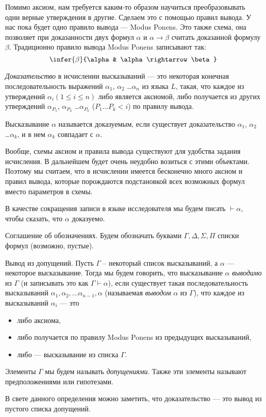 Помимо аксиом, нам требуется каким-то образом научиться преобразовывать одни верные утверждения
в другие.
Сделаем это с помощью правил вывода. У нас пока будет одно правило вывода --- Modus Ponens.
Это также схема, она позволяет при доказанности двух формул $\alpha$ и $\alpha \rightarrow \beta$
считать доказанной формулу $\beta$. Традиционно правило вывода Modus Ponens записывают так:
$$\infer{\beta}{\alpha & \alpha \rightarrow \beta}$$

\begin{definition} \emph{Доказательство} в исчислении высказываний --- 
это некоторая конечная последовательность выражений 
$\alpha_1$, $\alpha_2$ \dots $\alpha_n$
из языка $L$, такая, что каждое из утверждений $\alpha_i (1 \le i \le n)$
либо является аксиомой, либо получается из других
утверждений $\alpha_{P_1}$, $\alpha_{P_2}$ \dots $\alpha_{P_k}$ 
($P_1 \dots P_k < i$) по правилу вывода.
\end{definition}

\begin{definition} Высказывание $\alpha$ называется доказуемым, если 
существует доказательство $\alpha_1$, $\alpha_2$ \dots $\alpha_k$, и в нем
$\alpha_k$ совпадает с $\alpha$. 
\end{definition}

Вообще, схемы аксиом и правила вывода существуют для удобства задания
исчисления. В дальнейшем будет очень неудобно возиться с этими объектами.
Поэтому мы считаем, что в исчислении имеется бесконечно много аксиом и правил вывода,
которые порождаются подстановкой всех возможных формул вместо параметров в схемы.

В качестве сокращения записи в языке исследователя мы будем писать $\vdash \alpha$,
чтобы сказать, что $\alpha$ доказуемо.

Соглашение об обозначениях. Будем обозначать буквами 
$\Gamma, \Delta, \Sigma, \Pi$ списки формул (возможно, пустые).

\begin{definition}{Вывод из допущений.}
Пусть $\Gamma$ -- некоторый список высказываний, а $\alpha$ --- 
некоторое высказывание. 
Тогда мы будем говорить, что высказывание $\alpha$ \emph{выводимо} из $\Gamma$ 
(и записывать это как $\Gamma \vdash \alpha$), если существует такая 
последовательность высказываний $\alpha_1, \alpha_2, \dots \alpha_{n-1}, \alpha$
(называемая \emph{выводом} $\alpha$ из $\Gamma$), 
что каждое из высказываний $\alpha_i$ --- это 
\begin{itemize}
\item либо аксиома,
\vspace{-0.2cm}
\item либо получается по правилу Modus Ponens из предыдущих высказываний, 
\vspace{-0.2cm}
\item либо --- высказывание из списка $\Gamma$.
\end{itemize}
Элементы $\Gamma$ мы будем называть \emph{допущениями}. Также эти элементы
называют предположениями или гипотезами. 
\end{definition}

В свете данного определения можно заметить, что доказательство --- это
вывод из пустого списка допущений. 
